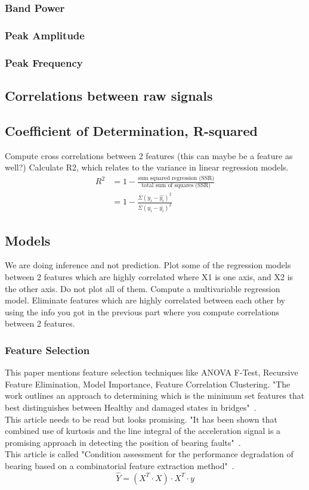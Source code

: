 \documentclass{article}
\begin{document}
\subsubsection{Band Power}
\subsubsection{Peak Amplitude}
\subsubsection{Peak Frequency}
\subsection{Correlations between raw signals}
\subsection{Coefficient of Determination, R-squared}
Compute cross correlations between 2 features (this can maybe be a feature as well?)
Calculate R2, which relates to the variance in linear regression models.
\begin{align*}
 R^2 &= 1 - \frac{\textrm{sum squared regression (SSR)}}{\textrm{total sum of squares (SSR)}} \\ 
 &= 1 - \frac{\Sigma(y_i - \hat{y_i})^2}{\Sigma(y_i - \bar{y_i})^2} 
\end{align*}
\subsection{Models}
We are doing inference and not prediction.
Plot some of the regression models between 2 features which are highly correlated where X1 is one axis, and X2 is the other axis. Do not plot all of them.
Compute a multivariable regression model.
Eliminate features which are highly correlated between each other by using the info you got in the previous part where you compute correlations between 2 features.
\subsubsection{Feature Selection}
This paper mentions feature selection techniques like ANOVA F-Test, Recursive Feature Elimination, Model Importance, Feature Correlation Clustering. "The work outlines an approach to determining which is the minimum set features that best distinguishes between Healthy and damaged states in bridges"~\cite{buckley2023feature}.\\
This article needs to be read but looks promising. "It has been shown that combined use of kurtosis and the line integral of the acceleration signal is a promising approach in detecting the position of bearing faults"~\cite{kateris2014machine}.\\
This article is called "Condition assessment for the performance degradation of bearing based on a combinatorial feature extraction method"~\cite{hong2014condition}.
$$ \hat{Y} = (X^T \cdot X) \cdot X^T \cdot y $$
\end{document}
